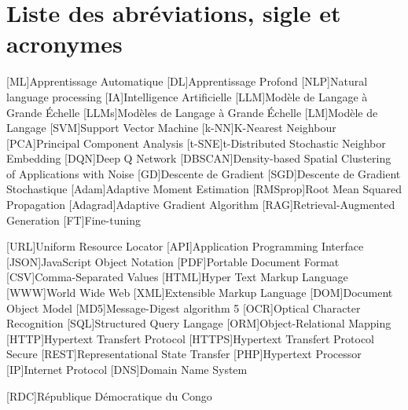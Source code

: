 

\chapter*{Liste des abréviations, sigle et acronymes}

\begin{acronym}[LLM]

[ML]{Apprentissage Automatique}
[DL]{Apprentissage Profond}
[NLP]{Natural language processing}
[IA]{Intelligence Artificielle}
[LLM]{Modèle de Langage à Grande Échelle}
[LLMs]{Modèles de Langage à Grande Échelle}
[LM]{Modèle de Langage}
[SVM]{Support Vector Machine}
[k-NN]{K-Nearest Neighbour}
[PCA]{Principal Component Analysis}
[t-SNE]{t-Distributed Stochastic Neighbor Embedding}
[DQN]{Deep Q Network}
[DBSCAN]{Density-based Spatial Clustering of Applications with Noise}
[GD]{Descente de Gradient}
[SGD]{Descente de Gradient Stochastique}
[Adam]{Adaptive Moment Estimation}
[RMSprop]{Root Mean Squared Propagation}
[Adagrad]{Adaptive Gradient Algorithm}
[RAG]{Retrieval-Augmented Generation}
[FT]{Fine-tuning}

[URL]{Uniform Resource Locator}
[API]{Application Programming Interface}
[JSON]{JavaScript Object Notation}
[PDF]{Portable Document Format}
[CSV]{Comma-Separated Values}
[HTML]{Hyper Text Markup Language}
[WWW]{World Wide Web}
[XML]{Extensible Markup Language}
[DOM]{Document Object Model}
[MD5]{Message-Digest algorithm 5}
[OCR]{Optical Character Recognition}
[SQL]{Structured Query Langage}
[ORM]{Object-Relational Mapping}
[HTTP]{Hypertext Transfert Protocol}
[HTTPS]{Hypertext Transfert Protocol Secure}
[REST]{Representational State Transfer}
[PHP]{Hypertext Processor}
[IP]{Internet Protocol}
[DNS]{Domain Name System}

[RDC]{République Démocratique du Congo}
\end{acronym}  
                   
\endgroup
